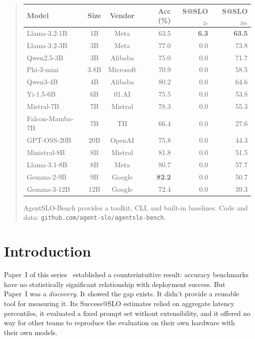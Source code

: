 \documentclass[11pt]{article}
\begin{document}
\begin{abstract}
\begin{center}
\small
\begin{tabular}{lcc rrr}
\toprule
\textbf{Model} & \textbf{Size} & \textbf{Vendor} & \textbf{Acc (\%)} & \textbf{S@SLO$_{2s}$} & \textbf{S@SLO$_{30s}$} \\
\midrule
Llama-3.2-1B    & 1B   & Meta     & 63.5 & \textbf{6.3}  & \textbf{63.5} \\
Llama-3.2-3B    & 3B   & Meta     & 77.0 & 0.0  & 73.8 \\
Qwen2.5-3B      & 3B   & Alibaba  & 75.0 & 0.0  & 71.7 \\
Phi-3-mini       & 3.8B & Microsoft& 70.9 & 0.0  & 58.5 \\
Qwen3-4B         & 4B   & Alibaba  & 80.2 & 0.0  & 64.6 \\
Yi-1.5-6B        & 6B   & 01.AI    & 75.5 & 0.0  & 53.8 \\
Mistral-7B       & 7B   & Mistral  & 78.3 & 0.0  & 55.3 \\
Falcon-Mamba-7B  & 7B   & TII      & 66.4 & 0.0  & 27.6 \\
GPT-OSS-20B      & 20B  & OpenAI   & 75.8 & 0.0  & 44.3 \\
Ministral-8B     & 8B   & Mistral  & 81.8 & 0.0  & 51.5 \\
Llama-3.1-8B     & 8B   & Meta     & 80.7 & 0.0  & 57.7 \\
Gemma-2-9B       & 9B   & Google   & \textbf{82.2} & 0.0  & 50.7 \\
Gemma-3-12B      & 12B  & Google   & 72.4 & 0.0  & 39.3 \\
\bottomrule
\end{tabular}
\end{center}

AgentSLO-Bench provides a toolkit, CLI, and built-in baselines.  Code and data: \texttt{github.com/agent-slo/agentslo-bench}.
\end{abstract}

\section{Introduction}

Paper~I of this series~\cite{maloney2025deploymentgap} established a counterintuitive result: accuracy benchmarks have no statistically significant relationship with deployment success.  But Paper~I was a \emph{discovery}.  It showed the gap exists.  It didn't provide a reusable tool for measuring it.  Its Success@SLO estimates relied on aggregate latency percentiles, it evaluated a fixed prompt set without extensibility, and it offered no way for other teams to reproduce the evaluation on their own hardware with their own models.
\end{document}
